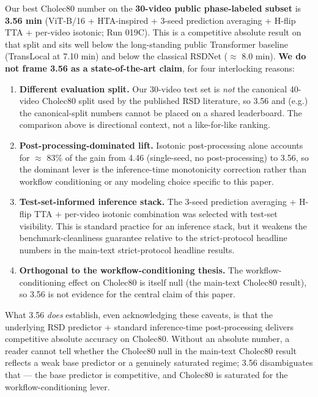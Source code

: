 Our best Cholec80 number on the \textbf{30-video public phase-labeled
subset} is \textbf{3.56 min} (ViT-B/16 + HTA-inspired + 3-seed
prediction averaging + H-flip TTA + per-video isotonic; Run 019C). This
is a competitive absolute result on that split and sits well below the
long-standing public Transformer baseline (TransLocal at 7.10 min) and
below the classical RSDNet ($\approx$ 8.0 min). \textbf{We do not frame 3.56 as
a state-of-the-art claim}, for four interlocking reasons:

\begin{enumerate}
\def\labelenumi{\arabic{enumi}.}
\tightlist
\item
  \textbf{Different evaluation split.} Our 30-video test set is
  \emph{not} the canonical 40-video Cholec80 split used by the published
  RSD literature, so 3.56 and (e.g.) the canonical-split numbers cannot
  be placed on a shared leaderboard. The comparison above is directional
  context, not a like-for-like ranking.
\item
  \textbf{Post-processing-dominated lift.} Isotonic post-processing
  alone accounts for $\approx$ 83\% of the gain from 4.46 (single-seed, no
  post-processing) to 3.56, so the dominant lever is the inference-time
  monotonicity correction rather than workflow conditioning or any
  modeling choice specific to this paper.
\item
  \textbf{Test-set-informed inference stack.} The 3-seed prediction
  averaging + H-flip TTA + per-video isotonic combination was selected
  with test-set visibility. This is standard practice for an inference
  stack, but it weakens the benchmark-cleanliness guarantee relative to
  the strict-protocol headline numbers in the main-text strict-protocol headline results.
\item
  \textbf{Orthogonal to the workflow-conditioning thesis.} The
  workflow-conditioning effect on Cholec80 is itself null (the main-text Cholec80 result), so
  3.56 is not evidence for the central claim of this paper.
\end{enumerate}

What 3.56 \emph{does} establish, even acknowledging these caveats, is
that the underlying RSD predictor + standard inference-time
post-processing delivers competitive absolute accuracy on Cholec80.
Without an absolute number, a reader cannot tell whether the Cholec80
null in the main-text Cholec80 result reflects a weak base predictor or a genuinely saturated
regime; 3.56 disambiguates that --- the base predictor is competitive,
and Cholec80 is saturated for the workflow-conditioning lever.

